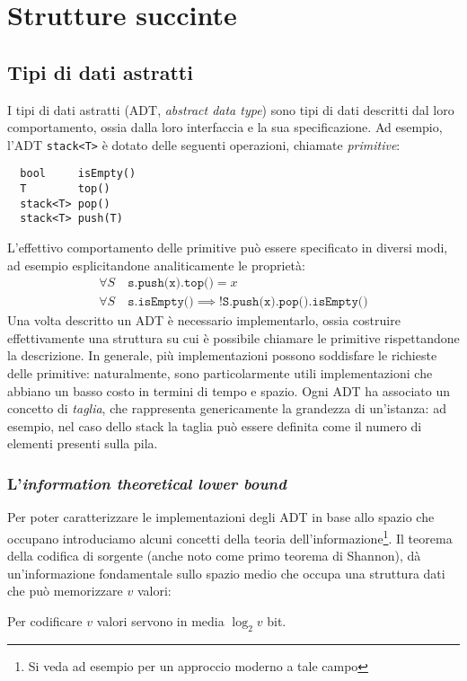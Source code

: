 \chapter{Strutture succinte}



\section{Tipi di dati astratti}
I tipi di dati astratti (ADT, \textit{abstract data type}) sono tipi di dati descritti dal loro comportamento, ossia dalla loro interfaccia e la sua specificazione.
Ad esempio, l'ADT \texttt{stack<T>} è dotato delle seguenti operazioni, chiamate \emph{primitive}:
\begin{verbatim}
  bool     isEmpty()
  T        top()
  stack<T> pop()
  stack<T> push(T)
\end{verbatim}
L'effettivo comportamento delle primitive può essere specificato in diversi modi, ad esempio esplicitandone analiticamente le proprietà:
\begin{gather*}
	\forall S\quad \texttt{s.push(x).top()} = x \\
	\forall S\quad \texttt{s.isEmpty()} \implies \texttt{!S.push(x).pop().isEmpty()}
\end{gather*}
Una volta descritto un ADT è necessario implementarlo, ossia costruire effettivamente una struttura su cui è possibile chiamare le primitive rispettandone la descrizione.
In generale, più implementazioni possono soddisfare le richieste delle primitive: naturalmente, sono particolarmente utili implementazioni che abbiano un basso costo in termini di tempo e spazio.
Ogni ADT ha associato un concetto di \emph{taglia}, che rappresenta genericamente la grandezza di un'istanza: ad esempio, nel caso dello stack la taglia può essere definita come il numero di elementi presenti sulla pila.


\subsection{L'\textit{information theoretical lower bound}}
Per poter caratterizzare le implementazioni degli ADT in base allo spazio che occupano introduciamo alcuni concetti della teoria dell'informazione\footnote{Si veda ad esempio \cite{Cover:06:informtheory} per un approccio moderno a tale campo}.
Il teorema della codifica di sorgente \cite{Shannon:48:theorycommu} (anche noto come primo teorema di Shannon), dà un'informazione fondamentale sullo spazio medio che occupa una struttura dati che può memorizzare $v$ valori:
\begin{theorem}
	\label{thm:shannon}
	Per codificare $v$ valori servono in media $\log_2 v$ bit.
\end{theorem}

